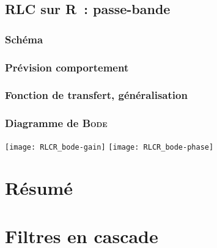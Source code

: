 \documentclass[../../main/main.tex]{subfiles}
\begin{document}
\subsection{RLC sur R~: passe-bande}
\subsubsection{Schéma}
\subsubsection{Prévision comportement}
\subsubsection{Fonction de transfert, généralisation}
\subsubsection{Diagramme de \textsc{Bode}}
\begin{center}
	\texttt{[image: RLCR\_bode-gain]}
	\texttt{[image: RLCR\_bode-phase]}
\end{center}

\section{Résumé}

\section{Filtres en cascade}
\end{document}
